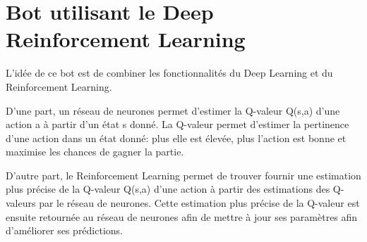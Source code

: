 \documentclass[a4paper,12pt]{article}
\begin{document}

\section{Bot utilisant le Deep Reinforcement Learning}

L'idée de ce bot est de combiner les fonctionnalités du Deep Learning et du Reinforcement Learning.


D'une part, un réseau de neurones permet d'estimer la Q-valeur Q(s,a) d'une action a à partir d'un état s donné. La Q-valeur permet d'estimer la pertinence d'une action dans un état donné: plus elle est élevée, plus l'action est bonne et maximise les chances de gagner la partie.


D'autre part, le Reinforcement Learning permet de trouver fournir une estimation plus précise de la Q-valeur Q(s,a) d'une action à partir des estimations des Q-valeurs par le réseau de neurones. Cette estimation plus précise de la Q-valeur est ensuite retournée au réseau de neurones afin de mettre à jour ses paramètres afin d'améliorer ses prédictions.
\end{document}

